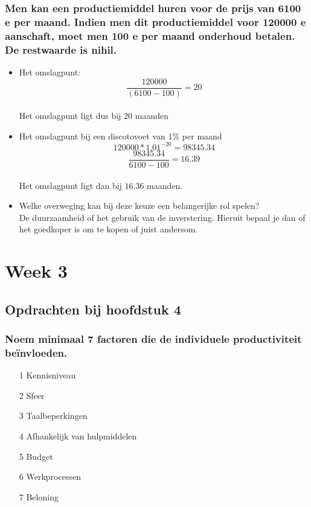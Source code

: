 \documentclass[a4paper,titlepage]{artikel1}
\begin{document}
   \subsubsection[Opdracht 5]{Men kan een productiemiddel huren voor de
   prijs van 6100 e per maand. Indien men dit productiemiddel voor
   120000 e aanschaft, moet men 100 e per maand onderhoud betalen. De
   restwaarde is nihil.}
    \begin{itemize}
     \item Het omslagpunt:
	   \begin{displaymath}
	    \frac{120000}{(6100-100)}=20
	   \end{displaymath}
	   \\Het omslagpunt ligt dus bij 20 maanden
     \item Het omslagpunt bij een discotovoet van $1\%$ per maand
	   \begin{displaymath}
	    120000*1.01^{-20}=98345.34
	   \end{displaymath}
	   \begin{displaymath}
	    \frac{98345.34}{6100-100}=16.39
	   \end{displaymath}
	   \\
           Het omslagpunt ligt dan bij $16.36$ maanden.
     \item Welke overweging kan bij deze keuze een belangerijke rol spelen?\\De duurzaamheid of het gebruik van de inverstering. Hieruit bepaal je dan of het goedkoper is om te kopen of juist andersom.
    \end{itemize}
    
 \section{Week 3}
  \subsection{Opdrachten bij hoofdstuk 4}
   \subsubsection[Opdracht 1]{Noem minimaal 7 factoren die de individuele productiviteit be\"invloeden.}
   \begin{itemize}
    \item[1] Kennisniveau
    \item[2] Sfeer
    \item[3] Taalbeperkingen
    \item[4] Afhankelijk van hulpmiddelen
    \item[5] Budget
    \item[6] Werkprocessen
    \item[7] Beloning
   \end{itemize}
   
\end{document}

